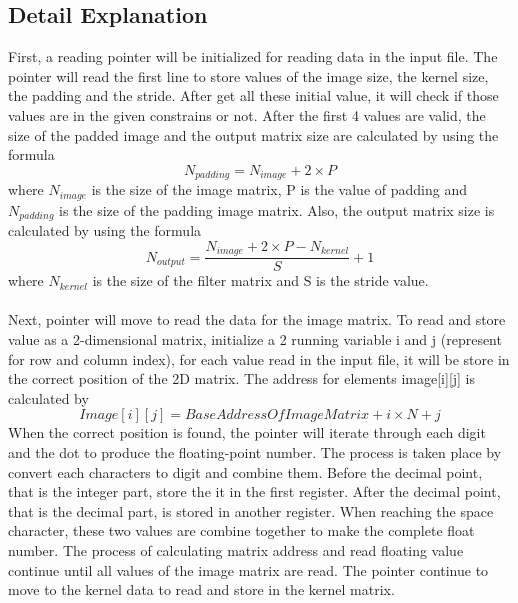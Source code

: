 \documentclass[a4paper]{article}
\begin{document}
\subsection{Detail Explanation}
First, a reading pointer will be initialized for reading data in the input file. The pointer will read the first line to store values of the image size, the kernel size, the padding and the stride. After get all these initial value, it will check if those values are in the given constrains or not. After the first 4 values are valid, the size of the padded image and the output matrix size are calculated by using the formula 
\begin{equation*}
	N_{padding} = N_{image} + 2 \times P
\end{equation*}
where $N_{image}$ is the size of the image matrix, P is the value of padding and $N_{padding}$ is the size of the padding image matrix. Also, the output matrix size is calculated by using the formula
\begin{equation*}
	N_{output} = \frac{N_{image} + 2 \times P - N_{kernel}}{S} + 1
\end{equation*} 
where $N_{kernel}$ is the size of the filter matrix and S is the stride value.\\ \\
Next, pointer will move to read the data for the image matrix. To read and store value as a 2-dimensional matrix, initialize a 2 running variable i and j (represent for row and column index), for each value read in the input file, it will be store in the correct position of the 2D matrix. The address for elements image[i][j] is calculated by
\begin{equation*}
	Image[i][j] = BaseAddressOfImageMatrix + i \times N + j 
\end{equation*} 
When the correct position is found, the pointer will iterate through each digit and the dot to produce the floating-point number. The process is taken place by convert each characters to digit and combine them. Before the decimal point, that is the integer part, store the it in the first register. After the decimal point, that is the decimal part, is stored in another register. When reaching the space character, these two values are combine together to make the complete float number. The process of calculating matrix address and read floating value continue until all values of the image matrix are read. The pointer continue to move to the kernel data to read and store in the kernel matrix.\\ \\
\end{document}
